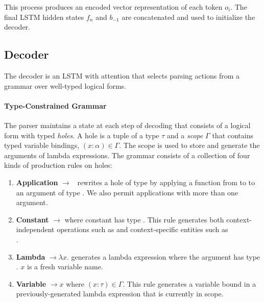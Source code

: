 This process produces an encoded vector representation of each token $o_i$. The 
final LSTM hidden states $f_n$ and $b_{-1}$ are concatenated  and used to 
initialize the decoder.

\subsection{Decoder}\label{sec:nnsp_decoder}

The decoder is an LSTM with attention that selects parsing actions from a 
grammar over well-typed logical forms.

\paragraph{Type-Constrained Grammar} The parser maintains a state at each step 
of decoding that consists of a logical form with typed \emph{holes}.
A hole is a tuple \hole{\tau}{\Gamma} of a type $\tau$ and a \emph{scope} 
$\Gamma$ that contains typed variable bindings, $(x:\alpha) \in \Gamma$.
The scope is used to store and generate the arguments of lambda expressions. 
The grammar consists of a collection of four kinds of production rules on holes:

\begin{enumerate}
    \item \textbf{Application} 
\hole{\tau}{\Gamma}$\rightarrow$\pred{(}\hole{\func{\beta}{\tau}}{\Gamma}~\hole{\beta}{\Gamma}\pred{)}
rewrites a hole of type \type{\tau} by applying a 
function from \type{\beta} to \type{\tau} to an argument of type \type{\beta}. 
We also permit applications with more than one argument.
    \item \textbf{Constant} \hole{\tau}{\Gamma}$\rightarrow$ where 
constant  has type \type{\tau}. This rule generates both 
context-independent operations such as  and context-specific 
entities such as\\
.
    \item \textbf{Lambda} \hole{\func{\alpha}{\tau}}{\Gamma}$\rightarrow 
\lambda x$.  generates a lambda 
expression where the argument has type \type{\alpha}. $x$ is a fresh variable 
name.
    \item \textbf{Variable} \hole{\tau}{\Gamma}$\rightarrow x$ where $(x : 
\tau) \in \Gamma$. This rule generates a variable bound in a 
previously-generated lambda expression that is currently in scope.
\end{enumerate}

